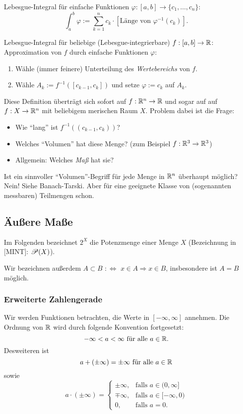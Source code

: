 \documentclass[
 a4paper,
 12pt,
 parskip=half
 ]{scrartcl}
\theoremstyle{plain}
\theoremstyle{definition}
\numberwithin{equation}{section}
\begin{document}
Lebesgue-Integral für einfache Funktionen $\varphi:[a,b] \to \{ c_1, \ldots, c_n \}$:
\[ \int_a^b \varphi := \sum_{k=1}^n c_k \cdot [ \text{Länge von } \varphi^{-1}(c_k) ]. \]

Lebesgue-Integral für beliebige (Lebesgue-integrierbare) $f:[a,b]\to\mathbb{R}$: Approximation von $f$ durch einfache Funktionen $\varphi$:
\begin{enumerate}
 \item Wähle (immer feinere) Unterteilung des \emph{Wertebereichs} von $f$.
 \item Wähle $A_k := f^{-1}([c_{k-1},c_k])$ und setze $\varphi := c_k$ auf $A_k$.
\end{enumerate}

Diese Definition überträgt sich sofort auf $f: \mathbb{R}^n \to \mathbb{R}$ und sogar auf auf $f: X \to \mathbb{R}^n$ mit beliebigem merischen Raum $X$. Problem dabei ist die Frage: 
\begin{itemize}
 \item Wie ``lang'' ist $f^{-1}((c_{k-1},c_k))$?
 \item Welches ``Volumen'' hat diese Menge? (zum Beispiel $f: \mathbb{R}^3 \to \mathbb{R}^3$)
 \item Allgemein: Welches \emph{Maß} hat sie?
\end{itemize}
Ist ein sinnvoller ``Volumen''-Begriff für jede Menge in $\mathbb{R}^n$ überhaupt möglich? Nein! Siehe Banach-Tarski. Aber für eine geeignete Klasse von (sogenannten messbaren) Teilmengen schon.

\subsection{Äußere Maße}
Im Folgenden bezeichnet $2^X$ die Potenzmenge einer Menge $X$ (Bezeichnung in [MINT]: $\mathscr{P}(X)$).

Wir bezeichnen außerdem $A \subset B$ $:\Leftrightarrow$ $x \in A \Rightarrow x \in B$, insbesondere ist $A = B$ möglich.

\subsubsection{Erweiterte Zahlengerade}
Wir werden Funktionen betrachten, die Werte in $[-\infty, \infty]$ annehmen. Die Ordnung von $\mathbb{R}$ wird durch folgende Konvention fortgesetzt:
\[ - \infty < a < \infty \text{ für alle } a \in \mathbb{R}. \]
Desweiteren ist 
\[ a + (\pm \infty) = \pm \infty \text{ für alle } a \in \mathbb{R} \]
sowie 
\[ a \cdot (\pm \infty) = \begin{cases}
                           \pm \infty, &\text{falls } a \in (0, \infty] \\
                           \mp \infty, &\text{falls } a \in [-\infty, 0) \\
                           0, &\text{falls } a = 0.
                          \end{cases} \]
\end{document}
